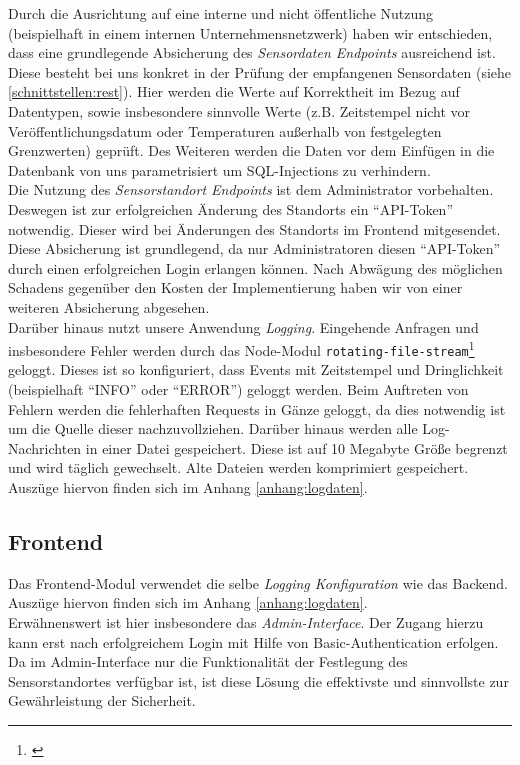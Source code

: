 Durch die Ausrichtung auf eine interne und nicht öffentliche Nutzung (beispielhaft in einem internen Unternehmensnetzwerk) haben wir entschieden, dass eine grundlegende Absicherung des \textit{Sensordaten Endpoints} ausreichend ist.
Diese besteht bei uns konkret in der Prüfung der empfangenen Sensordaten (siehe \cref{schnittstellen:rest}). Hier werden die Werte auf Korrektheit im Bezug auf Datentypen, sowie insbesondere sinnvolle Werte (z.B. Zeitstempel nicht vor Veröffentlichungsdatum oder Temperaturen außerhalb von festgelegten Grenzwerten) geprüft.
Des Weiteren werden die Daten vor dem Einfügen in die Datenbank von uns parametrisiert um SQL-Injections zu verhindern.\\
Die Nutzung des \textit{Sensorstandort Endpoints} ist dem Administrator vorbehalten.
Deswegen ist zur erfolgreichen Änderung des Standorts ein \enquote{API-Token} notwendig.
Dieser wird bei Änderungen des Standorts im Frontend mitgesendet.
Diese Absicherung ist grundlegend, da nur Administratoren diesen \enquote{API-Token} durch einen erfolgreichen Login erlangen können.
Nach Abwägung des möglichen Schadens gegenüber den Kosten der Implementierung haben wir von einer weiteren Absicherung abgesehen.\\
Darüber hinaus nutzt unsere Anwendung \textit{Logging}.
Eingehende Anfragen und insbesondere Fehler werden durch das Node-Modul \texttt{rotating-file-stream}\footnote{\cite{rfs}} geloggt.
Dieses ist so konfiguriert, dass Events mit Zeitstempel und Dringlichkeit (beispielhaft \enquote{INFO} oder \enquote{ERROR}) geloggt werden.
Beim Auftreten von Fehlern werden die fehlerhaften Requests in Gänze geloggt, da dies notwendig ist um die Quelle dieser nachzuvollziehen.
Darüber hinaus werden alle Log-Nachrichten in einer Datei gespeichert.
Diese ist auf 10 Megabyte Größe begrenzt und wird täglich gewechselt.
Alte Dateien werden komprimiert gespeichert.
Auszüge hiervon finden sich im Anhang \ref{anhang:logdaten}.

\subsection{Frontend}

Das Frontend-Modul verwendet die selbe \textit{Logging Konfiguration} wie das Backend.
Auszüge hiervon finden sich im Anhang \ref{anhang:logdaten}.\\
Erwähnenswert ist hier insbesondere das \textit{Admin-Interface}.
Der Zugang hierzu kann erst nach erfolgreichem Login mit Hilfe von Basic-Authentication erfolgen.
Da im Admin-Interface nur die Funktionalität der Festlegung des Sensorstandortes verfügbar ist, ist diese Lösung die effektivste und sinnvollste zur Gewährleistung der Sicherheit.

